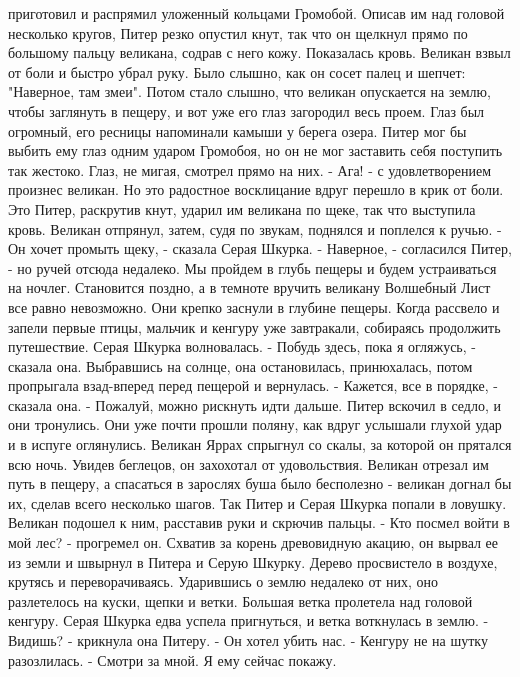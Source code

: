 приготовил и распрямил уложенный кольцами Громобой. Описав им над 
головой несколько кругов, Питер резко опустил кнут, так что он щелкнул 
прямо по большому пальцу великана, содрав с него кожу. Показалась 
кровь.
    Великан взвыл от боли и быстро убрал руку. Было слышно, как он 
сосет палец и шепчет: "Наверное, там змеи".
    Потом стало слышно, что великан опускается на землю, чтобы 
заглянуть в пещеру, и вот уже его глаз загородил весь проем. Глаз был 
огромный, его ресницы напоминали камыши у берега озера. Питер мог бы 
выбить ему глаз одним ударом Громобоя, но он не мог заставить себя 
поступить так жестоко. Глаз, не мигая, смотрел прямо на них.
    - Ага! - с удовлетворением произнес великан.
    Но это радостное восклицание вдруг перешло в крик от боли. Это 
Питер, раскрутив кнут, ударил им великана по щеке, так что выступила 
кровь. Великан отпрянул, затем, судя по звукам, поднялся и поплелся к 
ручью.
    - Он хочет промыть щеку, - сказала Серая Шкурка.
    - Наверное, - согласился Питер, - но ручей отсюда недалеко. Мы 
пройдем в глубь пещеры и будем устраиваться на ночлег. Становится 
поздно, а в темноте вручить великану Волшебный Лист все равно 
невозможно.
    Они крепко заснули в глубине пещеры. Когда рассвело и запели 
первые птицы, мальчик и кенгуру уже завтракали, собираясь продолжить 
путешествие.
    Серая Шкурка волновалась.
    - Побудь здесь, пока я огляжусь, - сказала она. Выбравшись на 
солнце, она остановилась, принюхалась, потом пропрыгала взад-вперед 
перед пещерой и вернулась.
    - Кажется, все в порядке, - сказала она. - Пожалуй, можно рискнуть 
идти дальше.
    Питер вскочил в седло, и они тронулись. Они уже почти прошли 
поляну, как вдруг услышали глухой удар и в испуге оглянулись. Великан 
Яррах спрыгнул со скалы, за которой он прятался всю ночь. Увидев 
беглецов, он захохотал от удовольствия. Великан отрезал им путь в 
пещеру, а спасаться в зарослях буша было бесполезно - великан догнал 
бы их, сделав всего несколько шагов. Так Питер и Серая Шкурка попали в 
ловушку. Великан подошел к ним, расставив руки и скрючив пальцы.
    - Кто посмел войти в мой лес? - прогремел он. Схватив за корень 
древовидную акацию, он вырвал ее из земли и швырнул в Питера и Серую 
Шкурку. Дерево просвистело в воздухе, крутясь и переворачиваясь. 
Ударившись о землю недалеко от них, оно разлетелось на куски, щепки и 
ветки. Большая ветка пролетела над головой кенгуру. Серая Шкурка едва 
успела пригнуться, и ветка воткнулась в землю.
    - Видишь? - крикнула она Питеру. - Он хотел убить нас. - Кенгуру 
не на шутку разозлилась. - Смотри за мной. Я ему сейчас покажу.
